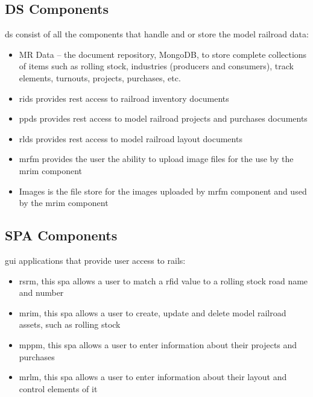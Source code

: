 \subsection{DS Components}
\gls{ds} consist of all the components that handle and or store the model railroad data:
\begin{itemize}
  \item MR Data – the document repository, MongoDB, to store complete collections of items such as rolling stock, industries (producers and consumers), track elements, turnouts, projects, purchases, etc.
  \item \gls{rids} provides \gls{rest} access to railroad inventory documents
  \item \gls{ppds} provides \gls{rest} access to model railroad projects and purchases documents
  \item \gls{rlds} provides \gls{rest} access to model railroad layout documents
  \item \gls{mrfm} provides the user the ability to upload image files for the use by the \gls{mrim} component
  \item Images is the file store for the images uploaded by \gls{mrfm} component and used by the \gls{mrim} component
\end{itemize}
\subsection{SPA Components}
\gls{gui} applications that provide user access to \gls{rails}:
\begin{itemize}
  \item \gls{rsrm}, this \gls{spa} allows a user to match a \gls{rfid} value to a rolling stock road name and number
  \item \gls{mrim}, this \gls{spa} allows a user to create, update and delete model railroad assets, such as rolling stock
  \item \gls{mppm}, this \gls{spa} allows a user to enter information about their projects and purchases
  \item \gls{mrlm}, this \gls{spa} allows a user to enter information about their layout and control elements of it
\end{itemize}
